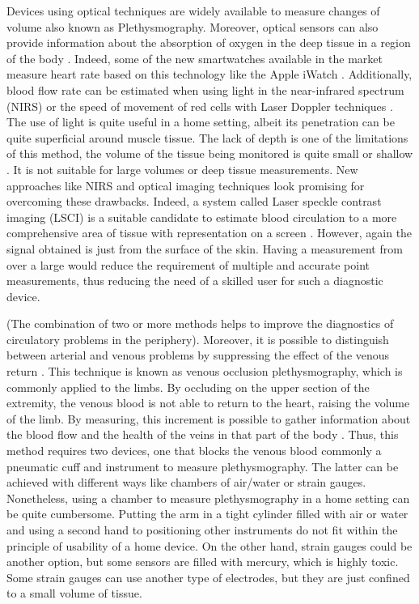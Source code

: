 Devices using optical techniques are widely available to measure changes of volume also known as Plethysmography. Moreover, optical sensors can also provide information about the absorption of oxygen in the deep tissue in a region of the body \cite{holohan1996plethysmography}. Indeed, some of the new smartwatches available in the market measure heart rate based on this technology like the Apple iWatch \cite{culbert2017user}. Additionally, blood flow rate can be estimated when using light in the near-infrared spectrum (NIRS) \cite{van2001performance, harel2008near, de1993noninvasive, gurley2012noninvasive} or the speed of movement of red cells with Laser Doppler techniques \cite{dirnagl1989continuous,fredriksson2007laser}. The use of light is quite useful in a home setting, albeit its penetration can be quite superficial around muscle tissue. The lack of depth is one of the limitations of this method, the volume of the tissue being monitored is quite small or shallow \cite{bashkatov2005optical}. It is not suitable for large volumes or deep tissue measurements. New approaches like NIRS and optical imaging techniques look promising for overcoming these drawbacks. Indeed, a system called Laser speckle contrast imaging (LSCI) is a suitable candidate to estimate blood circulation to a more comprehensive area of tissue with representation on a screen \cite{briers2013laser}. However, again the signal obtained is just from the surface of the skin. Having a measurement from over a large would reduce the requirement of multiple and accurate point measurements, thus reducing the need of a skilled user for such a diagnostic device. 

(The combination of two or more methods helps to improve the diagnostics of circulatory problems in the periphery). Moreover, it is possible to distinguish between arterial and venous problems by suppressing the effect of the venous return \cite{wilkinson2001venous}. This technique is known as venous occlusion plethysmography, which is commonly applied to the limbs. By occluding on the upper section of the extremity, the venous blood is not able to return to the heart, raising the volume of the limb. By measuring, this increment is possible to gather information about the blood flow and the health of the veins in that part of the body \cite{wilkinson2001venous}. Thus, this method requires two devices, one that blocks the venous blood commonly a pneumatic cuff and instrument to measure plethysmography. The latter can be achieved with different ways like chambers of air/water or strain gauges. Nonetheless, using a chamber to measure plethysmography in a home setting can be quite cumbersome. Putting the arm in a tight cylinder filled with air or water and using a second hand to positioning other instruments do not fit within the principle of usability of a home device. On the other hand, strain gauges could be another option, but some sensors are filled with mercury, which is highly toxic. Some strain gauges can use another type of electrodes, but they are just confined to a small volume of tissue. 

